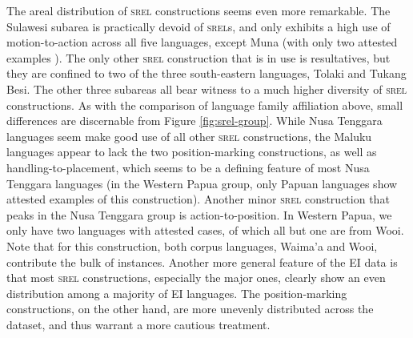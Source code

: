 The areal distribution of \textsc{srel} constructions seems even more remarkable. The Sulawesi subarea is practically devoid of \textsc{srel}s, and only exhibits a high use of motion-to-action across all five languages, except Muna (with only two attested examples%
). The only other \textsc{srel} construction that is in use is resultatives, but they are confined to two of the three south-eastern languages, Tolaki and Tukang Besi. The other three subareas all bear witness to a much higher diversity of \textsc{srel} constructions. As with the comparison of language family affiliation above, small differences are discernable from Figure \ref{fig:srel-group}. While Nusa Tenggara languages seem make good use of all other \textsc{srel} constructions, the Maluku languages appear to lack the two position-marking constructions, as well as handling-to-placement, which seems to be a defining feature of most Nusa Tenggara languages (in the Western Papua group, only Papuan languages show attested examples of this construction). Another minor \textsc{srel} construction that peaks in the Nusa Tenggara group is action-to-position. In Western Papua, we only have two languages with attested cases, of which all but one are from Wooi. Note that for this construction, both corpus languages, Waima'a and Wooi, contribute the bulk of instances. Another more general feature of the EI data%
is that most \textsc{srel} constructions, especially the major ones, clearly show an even distribution among a majority of EI languages. The position-marking constructions, on the other hand, are more unevenly distributed across the dataset, and thus warrant a more cautious treatment.

